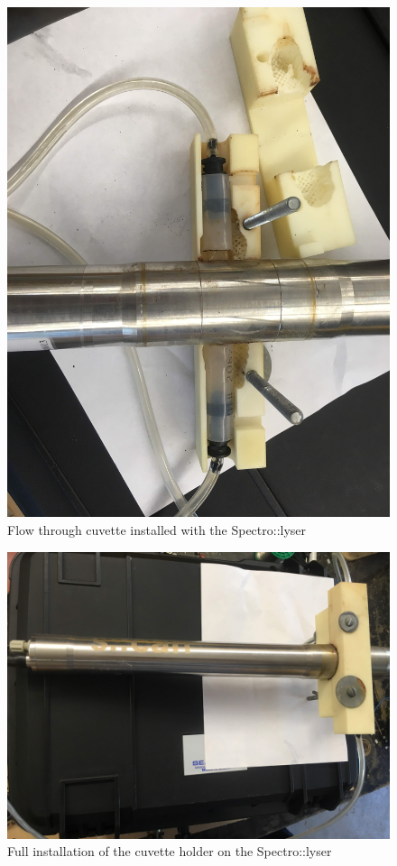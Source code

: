 \documentclass[]{book}
\begin{document}
\begin{figure}

{\centering \includegraphics[width=0.8\linewidth]{pictures/CuvetteSpectro1} 

}

\caption{Flow through cuvette installed with the Spectro::lyser}\label{fig:CuvetteSpectro1}
\end{figure}

\begin{figure}

{\centering \includegraphics[width=0.8\linewidth]{pictures/CuvetteSpectro2} 

}

\caption{Full installation of the cuvette holder on the Spectro::lyser}\label{fig:CuvetteSpectro2}
\end{figure}
\end{document}
